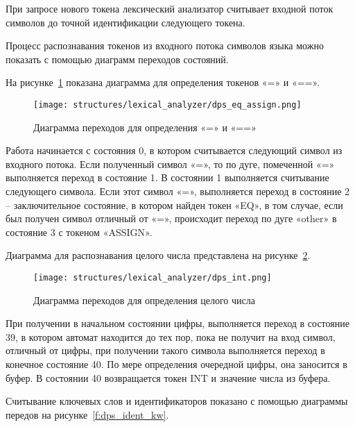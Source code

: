 При запросе нового токена лексический анализатор считывает входной поток символов до точной идентификации следующего токена.

Процесс распознавания токенов из входного потока символов языка можно показать с помощью диаграмм переходов состояний.

На рисунке~\ref{f:dps_eq_assign} показана диаграмма для определения токенов «=» и «==».

\begin{figure}[ht]
	\centering
	\vspace{\toppaddingoffigure}
	\texttt{[image: structures/lexical\_analyzer/dps\_eq\_assign.png]}
	\caption{Диаграмма переходов для определения «=» и «==»}
	\label{f:dps_eq_assign}
\end{figure}

Работа начинается с состояния 0, в котором считывается следующий символ из входного потока.
Если полученный символ «=», то по дуге, помеченной «=» выполняется переход в состояние 1.
В состоянии 1 выполняется считывание следующего символа.
Если этот символ «=», выполняется переход в состояние 2 – заключительное состояние,
в котором найден токен «EQ», в том случае, если был получен символ отличный от «=»,
происходит переход по дуге «other» в состояние 3 с токеном «ASSIGN».

Диаграмма для распознавания целого числа представлена на рисунке~\ref{f:dps_int}.

\begin{figure}[ht]
	\centering
	\vspace{\toppaddingoffigure}
	\texttt{[image: structures/lexical\_analyzer/dps\_int.png]}
	\caption{Диаграмма переходов для определения целого числа}
	\label{f:dps_int}
\end{figure}

При получении в начальном состоянии цифры, выполняется переход в состояние 39, в котором автомат находится до тех пор,
пока не получит на вход символ, отличный от цифры, при получении такого символа выполняется переход в конечное состояние 40.
По мере определения очередной цифры, она заносится в буфер.
В состоянии 40 возвращается токен INT и значение числа из буфера.

Считывание ключевых слов и идентификаторов показано с помощью диаграммы передов на рисунке~\ref{f:dps_ident_kw}.

